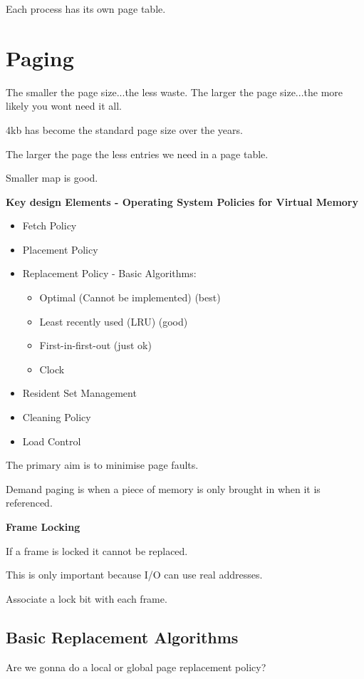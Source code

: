 \documentclass{article}
\begin{document}
Each process has its own page table.

\section*{Paging}

The smaller the page size...the less waste.
The larger the page size...the more likely you wont need it all.

4kb has become the standard page size over the years.

The larger the page the less entries we need in a page table.

Smaller map is good.

{\bf Key design Elements - Operating System Policies for Virtual Memory}

\begin{itemize}
\item Fetch Policy
\item Placement Policy
\item Replacement Policy - 
  Basic Algorithms:
  \begin{itemize}
  \item Optimal (Cannot be implemented) (best)
  \item Least recently used (LRU) (good)
  \item First-in-first-out (just ok)
  \item Clock 
  \end{itemize}
\item Resident Set Management
\item Cleaning Policy
\item Load Control
\end{itemize}

The primary aim is to minimise page faults.

Demand paging is when a piece of memory is only brought in when it is referenced.

{\bf Frame Locking}

If a frame is locked it cannot be replaced.

This is only important because I/O can use real addresses.

Associate a lock bit with each frame.

\subsection*{Basic Replacement Algorithms}

Are we gonna do a local or global page replacement policy?
\end{document}
